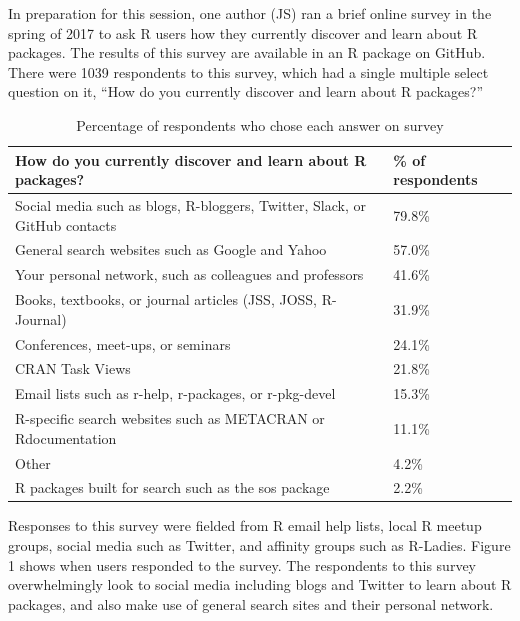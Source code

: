 In preparation for this session, one author (JS) ran a brief online
survey in the spring of 2017 to ask R users how they currently discover
and learn about R packages. The results of this survey are available in
an R package  \citep{packagesurvey} on GitHub. There
were 1039 respondents to this survey, which had a single multiple select
question on it, ``How do you currently discover and learn about R
packages?''

\begin{Schunk}
\begin{table}

\caption{\label{tab:unnamed-chunk-2}Percentage of respondents who chose each answer on survey}
\centering
\begin{tabular}[t]{ll}
\toprule
How do you currently discover and learn about R packages? & \% of respondents\\
\midrule
Social media such as blogs, R-bloggers, Twitter, Slack, or GitHub contacts & 79.8\%\\
General search websites such as Google and Yahoo & 57.0\%\\
Your personal network, such as colleagues and professors & 41.6\%\\
Books, textbooks, or journal articles (JSS, JOSS, R-Journal) & 31.9\%\\
Conferences, meet-ups, or seminars & 24.1\%\\
\addlinespace
CRAN Task Views & 21.8\%\\
Email lists such as r-help, r-packages, or r-pkg-devel & 15.3\%\\
R-specific search websites such as METACRAN or Rdocumentation & 11.1\%\\
Other & 4.2\%\\
R packages built for search such as the sos package & 2.2\%\\
\bottomrule
\end{tabular}
\end{table}

\end{Schunk}

Responses to this survey were fielded from R email help lists, local R
meetup groups, social media such as Twitter, and affinity groups such as
R-Ladies. Figure 1 shows when users responded to the survey. The
respondents to this survey overwhelmingly look to social media including
blogs and Twitter to learn about R packages, and also make use of
general search sites and their personal network.

